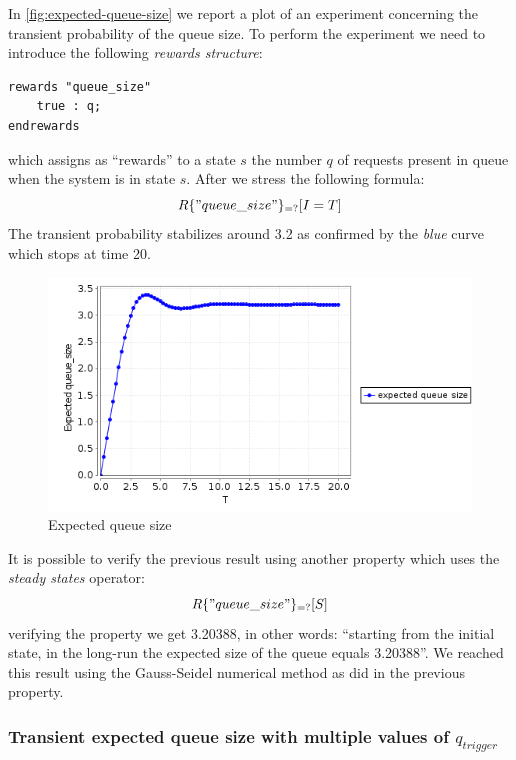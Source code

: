 In \autoref{fig:expected-queue-size} we report a plot of an experiment
concerning the transient probability of the queue size. To perform the
experiment we need to introduce the following \emph{rewards
  structure}:
\begin{verbatim}
rewards "queue_size"
	true : q;
endrewards
\end{verbatim}
which assigns as ``rewards'' to a state $s$ the number $q$ of requests
present in queue when the system is in state $s$. After we stress the
following formula:
\begin{displaymath}
  R\{"queue\_size"\}_{=?} [ I=T ]
\end{displaymath}
The transient probability stabilizes around 3.2 as confirmed by the
\emph{blue} curve which stops at time 20.
\begin{figure}[htb]
  \centering
  \includegraphics[width=13cm]{quantitative-project/expected-queue-size.png}
  \caption{Expected queue size}
  \label{fig:expected-queue-size}
\end{figure}
It is possible to verify the previous result using another property
which uses the \emph{steady states} operator:
\begin{displaymath}
  R\{"queue\_size"\}_{=?} [ S ]
\end{displaymath}
verifying the property we get 3.20388, in other words: ``starting from
the initial state, in the long-run the expected size of the queue
equals 3.20388''. We reached this result using the Gauss-Seidel
numerical method as did in the previous property.

\subsubsection{Transient expected queue size with multiple values of
  $q_{trigger}$}

